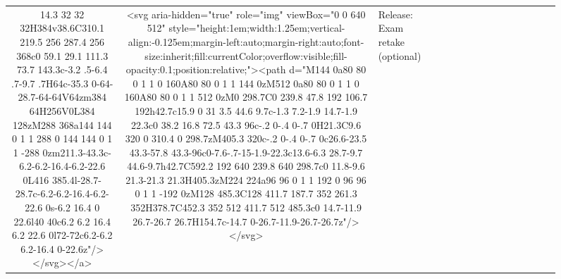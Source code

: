 \documentclass[
]{article}
\begin{document}
\begin{figure*}
\begin{longtable*}{cclllccccccccccl}
14.3 32 32 32H384v38.6C310.1 219.5 256 287.4 256 368c0 59.1 29.1 111.3 73.7 143.3c-3.2 .5-6.4 .7-9.7 .7H64c-35.3 0-64-28.7-64-64V64zm384 64H256V0L384 128zM288 368a144 144 0 1 1 288 0 144 144 0 1 1 -288 0zm211.3-43.3c-6.2-6.2-16.4-6.2-22.6 0L416 385.4l-28.7-28.7c-6.2-6.2-16.4-6.2-22.6 0s-6.2 16.4 0 22.6l40 40c6.2 6.2 16.4 6.2 22.6 0l72-72c6.2-6.2 6.2-16.4 0-22.6z"/></svg></a> & <svg aria-hidden="true" role="img" viewBox="0 0 640 512" style="height:1em;width:1.25em;vertical-align:-0.125em;margin-left:auto;margin-right:auto;font-size:inherit;fill:currentColor;overflow:visible;fill-opacity:0.1;position:relative;"><path d="M144 0a80 80 0 1 1 0 160A80 80 0 1 1 144 0zM512 0a80 80 0 1 1 0 160A80 80 0 1 1 512 0zM0 298.7C0 239.8 47.8 192 106.7 192h42.7c15.9 0 31 3.5 44.6 9.7c-1.3 7.2-1.9 14.7-1.9 22.3c0 38.2 16.8 72.5 43.3 96c-.2 0-.4 0-.7 0H21.3C9.6 320 0 310.4 0 298.7zM405.3 320c-.2 0-.4 0-.7 0c26.6-23.5 43.3-57.8 43.3-96c0-7.6-.7-15-1.9-22.3c13.6-6.3 28.7-9.7 44.6-9.7h42.7C592.2 192 640 239.8 640 298.7c0 11.8-9.6 21.3-21.3 21.3H405.3zM224 224a96 96 0 1 1 192 0 96 96 0 1 1 -192 0zM128 485.3C128 411.7 187.7 352 261.3 352H378.7C452.3 352 512 411.7 512 485.3c0 14.7-11.9 26.7-26.7 26.7H154.7c-14.7 0-26.7-11.9-26.7-26.7z"/></svg> & Release: Exam retake (optional) \\ 

\end{longtable*}
\end{figure*}
\end{document}
